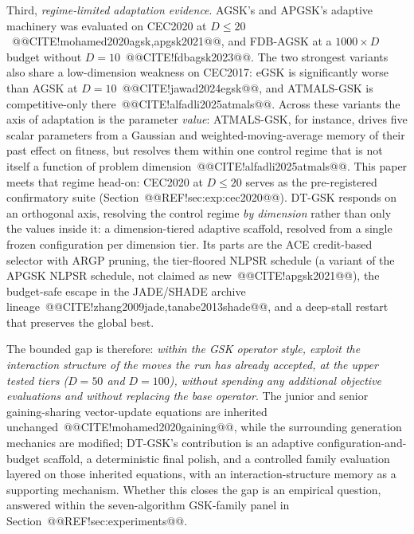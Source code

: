 \documentclass[10pt,a4paper]{article}
\newcommand{\dtgsk}{DT-GSK}
\newcommand{\atmals}{ATMALS-GSK}
\newcommand{\agsk}{AGSK}
\newcommand{\apgsk}{APGSK}
\newcommand{\fdbagsk}{FDB-AGSK}
\newcommand{\egsk}{eGSK}
\begin{document}
Third, \emph{regime-limited adaptation evidence}. \agsk{}'s and
\apgsk{}'s adaptive machinery was evaluated on CEC2020 at
$D \leq 20$~@@CITE!mohamed2020agsk,apgsk2021@@, and \fdbagsk{} at a
$1000 \times D$ budget without $D = 10$~@@CITE!fdbagsk2023@@. The two
strongest variants also share a low-dimension weakness on CEC2017: \egsk{} is
significantly worse than \agsk{} at $D = 10$~@@CITE!jawad2024egsk@@, and
\atmals{} is competitive-only there~@@CITE!alfadli2025atmals@@. 
Across these variants the axis of adaptation is the parameter \emph{value}:
\atmals{}, for instance, drives five scalar parameters from a Gaussian and
weighted-moving-average memory of their past effect on fitness, but resolves
them within one control regime that is not itself a function of problem
dimension~@@CITE!alfadli2025atmals@@. This paper meets that regime head-on:
CEC2020 at $D \leq 20$ serves as the pre-registered confirmatory suite
(Section~@@REF!sec:exp:cec2020@@). \dtgsk{} responds on an orthogonal axis,
resolving the control regime \emph{by dimension} rather than only the values
inside it: a dimension-tiered adaptive scaffold, resolved from a
single frozen configuration per dimension tier. Its parts are the ACE
credit-based selector with ARGP pruning, the tier-floored NLPSR schedule (a
variant of the APGSK NLPSR schedule, not claimed as
new~@@CITE!apgsk2021@@), the budget-safe escape
in the JADE/SHADE archive lineage~@@CITE!zhang2009jade,tanabe2013shade@@,
and a deep-stall restart that preserves the global best. 

The bounded gap is therefore: \emph{within the GSK operator style,
exploit the interaction structure of the moves the run has already
accepted, at the upper tested tiers ($D = 50$ and $D = 100$), without spending any additional objective
evaluations and without replacing the base operator}. 
The junior and senior gaining-sharing vector-update equations are inherited
unchanged~@@CITE!mohamed2020gaining@@, while the surrounding generation mechanics
are modified; \dtgsk{}'s contribution is an
adaptive configuration-and-budget scaffold, a deterministic final polish, and a controlled
family evaluation layered on those inherited equations, with an interaction-structure memory
as a supporting mechanism. 
Whether this closes the gap is an empirical question, answered within
the seven-algorithm GSK-family panel in Section~@@REF!sec:experiments@@.
\end{document}
